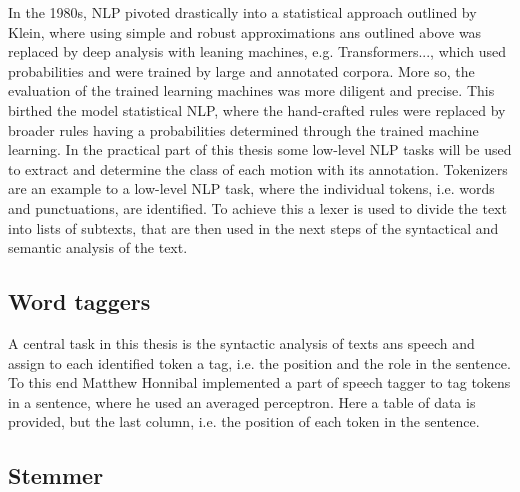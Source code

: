 In the 1980s, NLP pivoted drastically into a statistical approach outlined by Klein\cite{kleincs}, where using simple and robust approximations ans outlined above was replaced by deep analysis with leaning machines, e.g. Transformers..., which used probabilities and were trained by large and annotated corpora. More so, the evaluation of the trained learning machines was more diligent and precise\cite{nadkarni2011natural}. This birthed the model statistical NLP, where the hand-crafted rules were replaced by broader rules having a probabilities determined through the trained machine learning\cite{kleincs}. In the practical part of this thesis some low-level NLP tasks will be used to extract and determine the class of each motion with its annotation. Tokenizers are an example to a low-level NLP task, where the individual tokens, i.e. words and punctuations, are identified. To achieve this a lexer is used to divide the text into lists of subtexts, that are then used in the next steps of the syntactical and semantic analysis of the text.\newline
\subsection{Word taggers}\label{subsec:wordtaggers}
A central task in this thesis is the syntactic analysis of texts ans speech and assign to each identified token a tag, i.e. the position and the role in the sentence\cite{nadkarni2011natural}. To this end Matthew Honnibal implemented a part of speech tagger to tag tokens in a sentence, where he used an averaged perceptron. Here a table of data is provided, but the last column, i.e. the position of each token in the sentence. \cite{honnibal_2013} 
\subsection{Stemmer}\label{subsec:stemmer}
